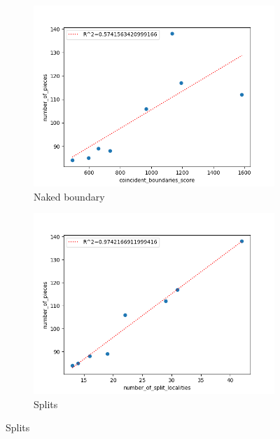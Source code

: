 \documentclass{mgggarticle}
\begin{document}
\begin{figure}
\centering
\begin{subfigure}{0.4\textwidth}
\centering
\includegraphics[width=\textwidth]{scatters/cb.png}
\caption{Naked boundary}
\end{subfigure}
\begin{subfigure}{0.4\textwidth}
\centering
\includegraphics[width=\textwidth]{scatters/splits.png}
\caption{Splits}
\end{subfigure}


\end{figure}
\end{document}
